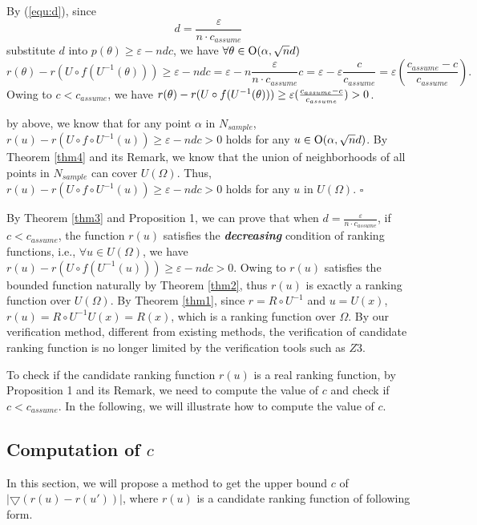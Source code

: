 By (\ref{equ:d}), since $$d = \frac{\varepsilon }{{n\cdot{c_{assume}}}}$$
substitute $d$ into $p(\theta ) \ge \varepsilon  - ndc$, we have $\forall \theta  \in {\rm O}(\alpha,\sqrt n d)$
\begin{equation}\label{equ:LMT(positive)}
r(\theta)-r(U \circ f({U^{ - 1}}(\theta))) \ge \varepsilon  - ndc = \varepsilon  - n\frac{\varepsilon }{{n\cdot{c_{assume}}}}c = \varepsilon  - \varepsilon \frac{c}{{{c_{assume}}}} = \varepsilon (\frac{{{c_{assume}} - c}}{{{c_{assume}}}}).
\end{equation}
Owing to $c < {c_{assume}}$, we have $r(\theta)-r(U \circ f({U^{ - 1}}(\theta))) \ge \varepsilon (\frac{{{c_{assume}} - c}}{{{c_{assume}}}}) > {\rm{0}}$.  

by above, we know that for any point $\alpha$ in $N_{sample}$, $r(u) - r(U \circ f \circ {U^{ - 1}}(u)) \ge \varepsilon -ndc > 0$ holds for any $u \in {\rm O}(\alpha,\sqrt n d)$. By Theorem \ref{thm4} and its Remark, we know that the union of neighborhoods of all points in $N_{sample}$ can cover $U(\Omega)$. Thus, $r(u) - r(U \circ f \circ {U^{ - 1}}(u)) \ge \varepsilon - ndc > 0 $ holds for any $u$ in $U(\Omega)$. $\square$


\begin{rem}
	By Theorem \ref{thm3} and Proposition 1, we can prove that when $d = \frac{\varepsilon }{{n\cdot{c_{assume}}}}$, if $c < {c_{assume}}$, the function $r(u)$ satisfies the \textbf{\emph{decreasing}} condition of ranking functions, i.e., $\forall u  \in U(\Omega)$, we have $r(u)-r(U \circ f({U^{ - 1}}(u))) \ge \varepsilon  - ndc > 0$. Owing to $r(u)$ satisfies the bounded function naturally by Theorem \ref{thm2}, thus $r(u)$ is exactly a ranking function over $U(\Omega )$. By Theorem \ref{thm1}, since $r=R\circ U^{-1}$ and $u=U(x)$, $r(u)=R\circ U^{-1} U(x) = R(x)$, which is a ranking function over $\Omega$. By our verification method, different from existing methods, the verification of candidate ranking function is no longer limited by the verification tools such as $Z3$.
\end{rem}

To check if the candidate ranking function $r(u)$ is a real ranking function, by Proposition 1 and its Remark, we need to compute the value of $c$ and check if $c<c_{assume}$. In the following, we will illustrate how to compute the value of $c$.
\subsection{Computation of $c$}
\label{Computation}
In this section, we will  propose a method to get the upper bound $c$ of $\left| \bigtriangledown{(r(u) - r(u'))} \right|$, where $r(u)$ is a candidate ranking function of following form.

